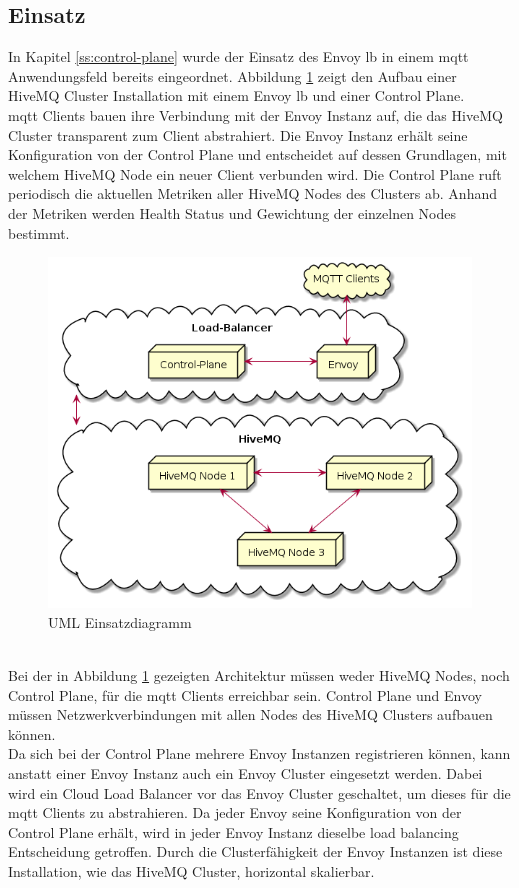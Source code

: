 \subsection{Einsatz}
In Kapitel \ref{ss:control-plane} wurde der Einsatz des Envoy \acl{lb} in einem \ac{mqtt} Anwendungsfeld bereits eingeordnet. Abbildung \ref{fig:deployment-diagram} zeigt den Aufbau einer HiveMQ Cluster Installation mit einem Envoy \ac{lb} und einer Control Plane.
\\
\ac{mqtt} Clients bauen ihre Verbindung mit der Envoy Instanz auf, die das HiveMQ Cluster transparent zum Client abstrahiert. Die Envoy Instanz erhält seine Konfiguration von der Control Plane und entscheidet auf dessen Grundlagen, mit welchem HiveMQ Node ein neuer Client verbunden wird. Die Control Plane ruft periodisch die aktuellen Metriken aller HiveMQ Nodes des Clusters ab. Anhand der Metriken werden Health Status und Gewichtung der einzelnen Nodes bestimmt.
\begin{figure}
    \centering
    \includegraphics[scale=0.6]{gen/deployment.png}
    \caption{UML Einsatzdiagramm}
    \label{fig:deployment-diagram}
\end{figure}
\\
Bei der in Abbildung \ref{fig:deployment-diagram} gezeigten Architektur müssen weder HiveMQ Nodes, noch Control Plane, für die \ac{mqtt} Clients erreichbar sein. Control Plane und Envoy müssen Netzwerkverbindungen mit allen Nodes des HiveMQ Clusters aufbauen können.
\\
Da sich bei der Control Plane mehrere Envoy Instanzen registrieren können, kann anstatt einer Envoy Instanz auch ein Envoy Cluster eingesetzt werden. Dabei wird ein Cloud Load Balancer vor das Envoy Cluster geschaltet, um dieses für die \ac{mqtt} Clients zu abstrahieren. Da jeder Envoy seine Konfiguration von der Control Plane erhält, wird in jeder Envoy Instanz dieselbe load balancing Entscheidung getroffen. Durch die Clusterfähigkeit der Envoy Instanzen ist diese Installation, wie das HiveMQ Cluster, horizontal skalierbar.
\newpage

